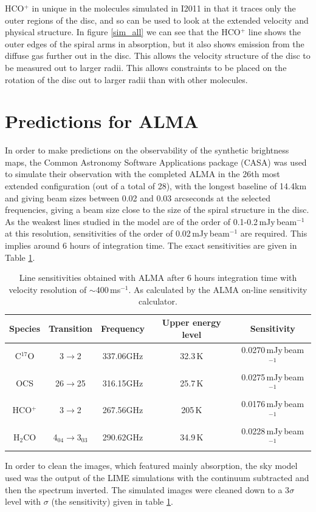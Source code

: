 \documentclass[useAMS,usenatbib]{mn2e}
\begin{document}
HCO$^+$ in unique in the molecules simulated in I2011 in that it traces only the outer regions of the disc, and so can be used to look at the extended velocity and physical structure. In figure \ref{sim_all} we can see that the HCO$^+$ line shows the outer edges of the spiral arms in absorption, but it also shows emission from the diffuse gas further out in the disc. This allows the velocity structure of the disc to be measured out to larger radii. This allows constraints to be placed on the rotation of the disc out to larger radii than with other molecules. 


\section{Predictions for ALMA} \label{sec:alma_predictions}

In order to make predictions on the observability of the synthetic brightness maps, the Common Astronomy Software Applications package (CASA) was used to simulate their observation with the completed ALMA in the 26th most extended configuration (out of a total of 28), with the longest baseline of 14.4km and giving beam sizes between 0.02 and 0.03 arcseconds at the selected frequencies, giving a beam size close to the size of the spiral structure in the disc. As the weakest lines studied in the model are of the order of 0.1-0.2$\,$mJy$\,$beam$^{-1}$ at this resolution, sensitivities of the order of 0.02$\,$mJy$\,$beam$^{-1}$ are required. This implies around 6 hours of integration time. The exact sensitivities are given in Table \ref{sigmas}.
\begin{table}
 \centering
 \begin{minipage}{80mm}
   \caption{Line sensitivities obtained with ALMA after 6 hours integration time with velocity resolution of $\sim$400$\,$ms$^{-1}$. As calculated by the ALMA on-line sensitivity calculator.}
   \label{sigmas}
   \begin{tabular}{c||c|c|c|c}
     \hline
     Species & Transition & Frequency & Upper energy level & Sensitivity\\
     \hline
     C$^{17}$O & 3$\rightarrow$2 & 337.06GHz & 32.3$\,$K & 0.0270$\,$mJy$\,$beam$^{-1}$ \\
     OCS & 26$\rightarrow$25 & 316.15GHz & 25.7$\,$K & 0.0275$\,$mJy$\,$beam$^{-1}$ \\
     HCO$^+$ & 3$\rightarrow$2 & 267.56GHz & 205$\,$K & 0.0176$\,$mJy$\,$beam$^{-1}$ \\
     H$_2$CO & 4$_{04}\rightarrow$3$_{03}$ &  290.62GHz & 34.9$\,$K & 0.0228$\,$mJy$\,$beam$^{-1}$ \\
     \hline
   \end{tabular}
 \end{minipage}
\end{table}
In order to clean the images, which featured mainly absorption, the sky model used was the output of the LIME simulations with the continuum subtracted and then the spectrum inverted. The simulated images were cleaned down to a 3$\sigma$ level with $\sigma$ (the sensitivity) given in table \ref{sigmas}.\smallskip
\end{document}
